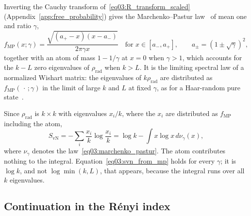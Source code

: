 \documentclass[11pt,letterpaper]{article}
\theoremstyle{plain}
\theoremstyle{definition}
\theoremstyle{remark}
\begin{document}
Inverting the Cauchy transform of~\eqref{eq03:R_transform_scaled} (Appendix~\ref{app:free_probability}) gives the Marchenko--Pastur law~\citep{marchenkopastur1967} of mean one and ratio $\gamma$,
\begin{equation}
\label{eq03:marchenko_pastur}
f_{\mathrm{MP}}(x; \gamma) = \frac{\sqrt{(a_+ - x)(x - a_-)}}{2\pi\gamma x} \quad \text{for } x \in [a_-, a_+], \qquad a_\pm = (1 \pm \sqrt{\gamma})^2,
\end{equation}
together with an atom of mass $1 - 1/\gamma$ at $x = 0$ when $\gamma > 1$, which accounts for the $k - L$ zero eigenvalues of $\rho_{\mathrm{rad}}$ when $k > L$. It is the limiting spectral law of a normalized Wishart matrix: the eigenvalues of $k\rho_{\mathrm{rad}}$ are distributed as $f_{\mathrm{MP}}(\,\cdot\,;\gamma)$ in the limit of large $k$ and $L$ at fixed $\gamma$, as for a Haar-random pure state~\citep{lubkin1978, lloydpagels1988, page1993entropy}.

Since $\rho_{\mathrm{rad}}$ is $k \times k$ with eigenvalues $x_i/k$, where the $x_i$ are distributed as $f_{\mathrm{MP}}$ including the atom,
\begin{equation}
\label{eq03:svn_from_mp}
S_{\mathrm{vN}} = -\sum_i \frac{x_i}{k} \log \frac{x_i}{k} = \log k - \int x \log x \, d\nu_\gamma(x),
\end{equation}
where $\nu_\gamma$ denotes the law~\eqref{eq03:marchenko_pastur}. The atom contributes nothing to the integral. Equation~\eqref{eq03:svn_from_mp} holds for every $\gamma$; it is $\log k$, and not $\log\min(k,L)$, that appears, because the integral runs over all $k$ eigenvalues.

\subsection{Continuation in the R\'enyi index}
\label{subsec03:carlson}
\end{document}
